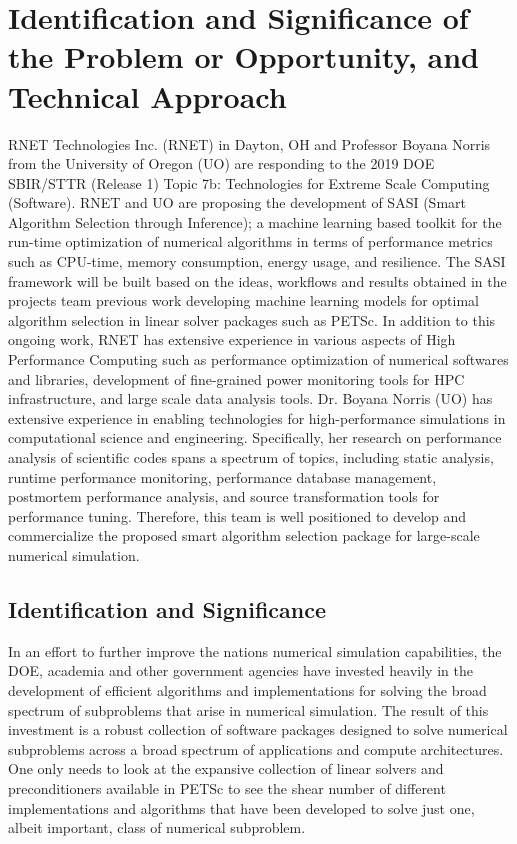 \section{Identification and Significance of the Problem or Opportunity, and Technical Approach}

RNET Technologies Inc. (RNET) in Dayton, OH and Professor Boyana Norris from the University of Oregon (UO) are responding to the 2019 DOE 
SBIR/STTR (Release 1) Topic 7b: Technologies for Extreme Scale Computing (Software). RNET and UO are proposing the development of SASI (Smart Algorithm Selection through Inference); a machine learning based toolkit for the run-time optimization of numerical algorithms in terms of performance metrics such as CPU-time, memory consumption, energy usage, and resilience. The SASI framework will be built based on the ideas, workflows and results obtained in the projects team previous work developing machine learning models for optimal algorithm selection in linear solver packages such as PETSc. In addition to this ongoing work, RNET has extensive experience in various aspects of High Performance Computing such as performance 
optimization of numerical softwares and libraries, development of fine-grained power monitoring tools 
for HPC infrastructure, and large scale data analysis tools. Dr. Boyana Norris (UO) has extensive experience 
in enabling technologies for high-performance simulations in computational science and engineering. 
Specifically, her research on performance analysis of scientific codes spans a spectrum of topics, 
including static analysis, runtime performance monitoring, performance database management, postmortem 
performance analysis, and source transformation tools for performance tuning. Therefore, 
this team is well positioned to develop and commercialize the proposed smart algorithm selection package for 
large-scale numerical simulation. 


\subsection{Identification and Significance}
\label{sec:introduction}

In an effort to further improve the nations numerical simulation capabilities, the DOE, academia and other government agencies have invested heavily in the development of efficient algorithms and implementations for solving the broad spectrum of subproblems that arise in numerical simulation.  The result of this investment is a robust collection of software packages designed to solve numerical subproblems across a broad spectrum of applications and compute architectures. One only needs to look at the expansive collection of linear solvers and preconditioners available in PETSc to see the shear number of different implementations and algorithms that have been developed to solve just one, albeit important, class of numerical subproblem.  

